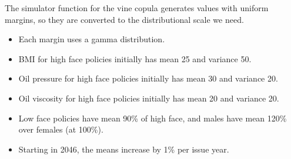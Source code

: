 \documentclass[
  letterpaper,
  DIV=11,
  numbers=noendperiod]{scrartcl}
\providecommand{\tightlist}{%
  \setlength{\itemsep}{0pt}\setlength{\parskip}{0pt}}\usepackage{longtable,booktabs,array}
\begin{document}
The simulator function for the vine copula generates values with uniform
margins, so they are converted to the distributional scale we need.

\begin{itemize}
\tightlist
\item
  Each margin uses a gamma distribution.
\item
  BMI for high face policies initially has mean 25 and variance 50.
\item
  Oil pressure for high face policies initially has mean 30 and variance
  20.
\item
  Oil viscosity for high face policies initially has mean 20 and
  variance 20.
\item
  Low face policies have mean 90\% of high face, and males have mean
  120\% over females (at 100\%).
\item
  Starting in 2046, the means increase by 1\% per issue year.
\end{itemize}
\end{document}
